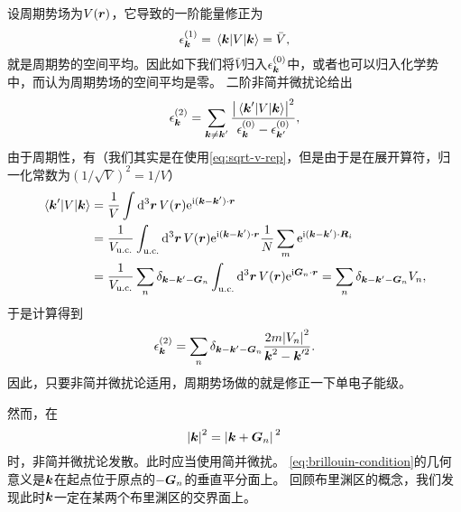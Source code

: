 设周期势场为$V(\vb*{r})$，它导致的一阶能量修正为
\begin{equation}
    \epsilon_{\vb*{k}}^{(1)} = \mel{\vb*{k}}{V}{\vb*{k}} = \bar{V},
\end{equation}
就是周期势的空间平均。因此如下我们将$\bar{V}$归入$\epsilon_{\vb*{k}}^{(0)}$中，或者也可以归入化学势中，而认为周期势场的空间平均是零。
二阶非简并微扰论给出
\begin{equation}
    \epsilon_{\vb*{k}}^{(2)} = \sum_{\vb*{k} \neq \vb*{k}'} \frac{\abs{\mel*{\vb*{k}'}{V}{\vb*{k}}}^2}{\epsilon_{\vb*{k}}^{(0)} - \epsilon_{\vb*{k}'}^{(0)}},
\end{equation}
由于周期性，有（我们其实是在使用\eqref{eq:sqrt-v-rep}，但是由于是在展开算符，归一化常数为$(1/\sqrt{V})^2 = 1 / V$）
\begin{equation}
    \begin{aligned}
        \mel*{\vb*{k}'}{V}{\vb*{k}} &= \frac{1}{V} \int \dd[3]{\vb*{r}} V(\vb*{r}) \mathrm{e}^{\mathrm{i} (\vb*{k} - \vb*{k}') \cdot \vb*{r}} \\
        &= \frac{1}{V_\text{u.c.}} \int_\text{u.c.} \dd[3]{\vb*{r}} V(\vb*{r}) \mathrm{e}^{\mathrm{i} (\vb*{k} - \vb*{k}') \cdot \vb*{r}} \frac{1}{N} \sum_m \mathrm{e}^{\mathrm{i} (\vb*{k} - \vb*{k}') \cdot \vb*{R}_i} \\
        &= \frac{1}{V_\text{u.c.}} \sum_n \delta_{\vb*{k} - \vb*{k}' - \vb*{G}_n} \int_\text{u.c.} \dd[3]{\vb*{r}} V(\vb*{r}) \mathrm{e}^{\mathrm{i} \vb*{G}_n \cdot \vb*{r}} = \sum_n \delta_{\vb*{k} - \vb*{k}' - \vb*{G}_n} V_n,
    \end{aligned}
\end{equation}
于是计算得到
\begin{equation}
    \epsilon_{\vb*{k}}^{(2)} = \sum_{n} \delta_{\vb*{k} - \vb*{k}' - \vb*{G}_n} \frac{2m \abs{V_n}^2}{\vb*{k}^2 - \vb*{k}'^2} .
\end{equation}
因此，只要非简并微扰论适用，周期势场做的就是修正一下单电子能级。

然而，在
\begin{equation}
    \abs{\vb*{k}}^2 = \abs*{\vb*{k} + \vb*{G}_n}^2
    \label{eq:brillouin-condition}
\end{equation}
时，非简并微扰论发散。此时应当使用简并微扰。%
\eqref{eq:brillouin-condition}的几何意义是$\vb*{k}$在起点位于原点的$-\vb*{G}_n$的垂直平分面上。
回顾布里渊区的概念，我们发现此时$\vb*{k}$一定在某两个布里渊区的交界面上。

